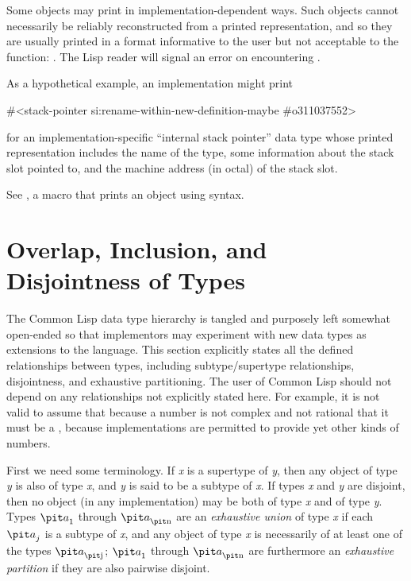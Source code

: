 Some objects may print in implementation-dependent ways.
Such objects cannot necessarily be reliably reconstructed from
a printed representation, and so they are usually printed in
a format informative to the user but not acceptable to the  function:
.
The Lisp reader will signal an error on encountering \cd{\#<}.

As a hypothetical example, an implementation might print
\begin{lisp}
\#<stack-pointer si:rename-within-new-definition-maybe \#o311037552>
\end{lisp}
for an implementation-specific ``internal stack pointer'' data type
whose printed representation includes the name of the type,
some information about the stack slot pointed to, and the machine address
(in octal) of the stack slot.

\begin{newer}
See , a macro that prints an object using \cd{\#<}
syntax.
\end{newer}

\section{Overlap, Inclusion, and Disjointness of Types}
\label{DATA-TYPE-RELATIONSHIPS}

The Common Lisp data type hierarchy is tangled and purposely left somewhat
open-ended so that implementors may experiment with new data types
as extensions to the language.  This section explicitly states all
the defined relationships between types, including subtype/supertype
relationships,
disjointness, and exhaustive partitioning.  The user of Common Lisp
should not depend on any relationships not explicitly stated here.
For example, it is not valid to assume that because a number
is not complex and not rational that it must be a , because
implementations are permitted to provide yet other kinds of numbers.

First we need some terminology.
If {\it x} is a supertype of {\it y}, then any object of type {\it y} is also
of type {\it x}, and {\it y} is said to be a subtype of {\it x}.  If types
{\it x} and {\it y} are disjoint, then no object (in any implementation) may
be both of type {\it x} and of type {\it y}.  Types ${\it a}_1$ through
${\it a}_{\hbox{\scriptsize\it n}}$ are an {\it exhaustive union}
of type {\it x} if each ${\it a}_j$
is a subtype of {\it x}, and any object of type {\it x} is
necessarily of at least one of the types ${\it a}_{\hbox{\scriptsize\it j}}$;
${\it a}_1$ through ${\it a}_{\hbox{\scriptsize\it n}}$ are furthermore an {\it exhaustive partition}
if they are also pairwise disjoint.


